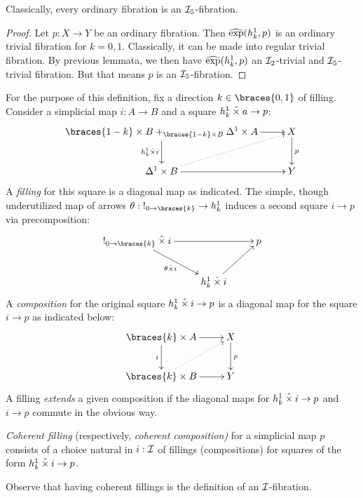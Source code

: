 \documentclass[reqno,10pt,a4paper,oneside]{amsart}
\begin{document}
\begin{lemma}
Classically, every ordinary fibration is an $\cal{I}_5$-fibration.
\end{lemma}

\begin{proof}
Let $p : X \to Y$ be an ordinary fibration.
Then $\hatexp(h_k^1, p)$ is an ordinary trivial fibration for $k = 0, 1$.
Classically, it can be made into regular trivial fibration.
By previous lemmata, we then have $\hatexp(h_k^1, p)$ an $\cal{I}_2$-trivial and $\cal{I}_5$-trivial fibration.
But that means $p$ is an $\cal{I}_5$-fibration.
\end{proof}

\begin{definition}
For the purpose of this definition, fix a direction $k \in \braces{0, 1}$ of filling.
Consider a simplicial map $i : A \to B$ and a square $h_k^1 \hattimes a \to p$:
\[
\xymatrix{
  \braces{1-k} \times B +_{\braces{1-k} \times B} \Delta^1 \times A
  \ar[r]
  \ar[d]_{h_k^1 \hattimes i}
&
  X
  \ar[d]^{p}
\\
  \Delta^1 \times B
  \ar[r]
  \ar@{.>}[ur]
&
  Y
}
\]
A \emph{filling} for this square is a diagonal map as indicated.
The simple, though underutilized map of arrows $\theta : \canonical_{0 \to \braces{k}} \to h_k^1$ induces a second square $i \to p$ via precomposition:
\[
\xymatrix{
  \canonical_{0 \to \braces{k}} \hattimes i
  \ar[rr]
  \ar[dr]_{\theta \hattimes i}
&&
  p
\\&
  h_k^1 \hattimes i
  \ar[ur]
}
\]
A \emph{composition} for the original square $h_k^1 \hattimes i \to p$ is a diagonal map for the square $i \to p$ as indicated below:
\[
\xymatrix{
  \braces{k} \times A
  \ar[r]
  \ar[d]_{i}
&
  X
  \ar[d]^{p}
\\
  \braces{k} \times B
  \ar[r]
  \ar@{.>}[ur]
&
  Y
}
\]
A filling \emph{extends} a given composition if the diagonal maps for $h_k^1 \hattimes i \to p$ and $i \to p$ commute in the obvious way.
\end{definition}

\begin{definition}
\emph{Coherent filling} (respectively, \emph{coherent composition)} for a simplicial map $p$ consists of a choice natural in $i : \cal{I}$ of fillings (compositions) for squares of the form $h_k^1 \hattimes i \to p$.
\end{definition}

Observe that having coherent fillings is the definition of an $\cal{I}$-fibration.
\end{document}
